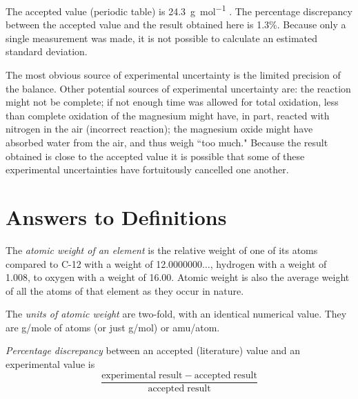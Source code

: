 \documentclass{article}
\begin{document}
The accepted value (periodic table) is \SI{24.3}{\gram\per\mole} \cite{Smith:2012qr}. The percentage discrepancy between the accepted value and the result obtained here is 1.3\%. Because only a single measurement was made, it is not possible to calculate an estimated standard deviation.

The most obvious source of experimental uncertainty is the limited precision of the balance. Other potential sources of experimental uncertainty are: the reaction might not be complete; if not enough time was allowed for total oxidation, less than complete oxidation of the magnesium might have, in part, reacted with nitrogen in the air (incorrect reaction); the magnesium oxide might have absorbed water from the air, and thus weigh ``too much." Because the result obtained is close to the accepted value it is possible that some of these experimental uncertainties have fortuitously cancelled one another.


\section{Answers to Definitions}

\begin{enumerate}
\begin{item}
The \emph{atomic weight of an element} is the relative weight of one of its atoms compared to C-12 with a weight of 12.0000000$\ldots$, hydrogen with a weight of 1.008, to oxygen with a weight of 16.00. Atomic weight is also the average weight of all the atoms of that element as they occur in nature.
\end{item}
\begin{item}
The \emph{units of atomic weight} are two-fold, with an identical numerical value. They are g/mole of atoms (or just g/mol) or amu/atom.
\end{item}
\begin{item}
\emph{Percentage discrepancy} between an accepted (literature) value and an experimental value is
\begin{equation*}
\frac{\mathrm{experimental\;result} - \mathrm{accepted\;result}}{\mathrm{accepted\;result}}
\end{equation*}
\end{item}
\end{enumerate}






\end{document}
